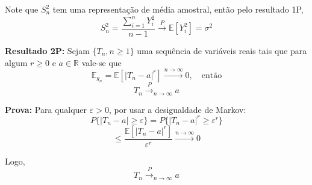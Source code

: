 Note que $S_n^2$ tem uma representação de média amostral, então pelo resultado 1P,
\begin{equation}
S_n^2 = \frac{\sum_{i=1}^n Y_i^2}{n-1} \xrightarrow{P} \mathbb{E}[Y_i^2] = \sigma^2
\end{equation}

\textbf{Resultado 2P:} Sejam $\{T_n, n \geq 1\}$ uma sequência de variáveis reais tais que para algum $r \geq 0$ e $a \in \mathbb{R}$ vale-se que
\begin{equation}
\mathbb{E}_{g_n} = \mathbb{E}\left[|T_n - a|^r\right] \xrightarrow{n \to \infty} 0, \quad \text{então}
\end{equation}
\begin{equation}
T_n \xrightarrow{P}_{n \to \infty} a
\end{equation}

\textbf{Prova:} Para qualquer $\varepsilon > 0$, por usar a desigualdade de Markov:
\begin{equation}
P\{|T_n - a| \geq \varepsilon\} = P\{|T_n - a|^r \geq \varepsilon^r\}
\end{equation}
\begin{equation}
\leq \frac{\mathbb{E}[|T_n - a|^r]}{\varepsilon^r} \xrightarrow{n \to \infty} 0
\end{equation}

Logo,
\begin{equation}
T_n \xrightarrow{P}_{n \to \infty} a
\end{equation}
